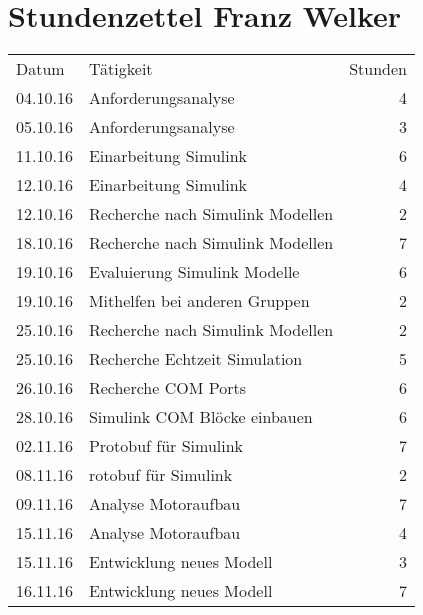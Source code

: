 \chapter{Stundenzettel Franz Welker}
\begin{minipage}{0.5\textwidth}
    \begin{tabular}{lp{4cm}r}
       Datum& Tätigkeit&Stunden\\
       
       04.10.16&Anforderungsanalyse&4 \\
       05.10.16&Anforderungsanalyse&3 \\
       
       11.10.16&Einarbeitung Simulink&6 \\
       12.10.16&Einarbeitung Simulink&4 \\
       12.10.16&Recherche nach \newline 
		        Simulink Modellen&2 \\
       
       18.10.16&Recherche nach \newline
		        Simulink Modellen&7 \\
       19.10.16&Evaluierung Simulink \newline
		        Modelle&6 \\
       19.10.16&Mithelfen bei anderen \newline
		        Gruppen&2 \\
       
       
       25.10.16&Recherche nach \newline
	            Simulink Modellen&2 \\
       25.10.16&Recherche Echtzeit \newline
		        Simulation&5 \\
       26.10.16&Recherche COM Ports&6 \\
       
       28.10.16&Simulink COM Blöcke einbauen&6\\
       02.11.16&Protobuf für Simulink&7 \\
       
       08.11.16&rotobuf für Simulink&2 \\
       09.11.16&Analyse Motoraufbau&7 \\
       
       15.11.16&Analyse Motoraufbau&4 \\
       15.11.16&Entwicklung neues \newline
		        Modell&3 \\
       16.11.16&Entwicklung neues \newline
		        Modell&7 \\



    \end{tabular}
\end{minipage}
